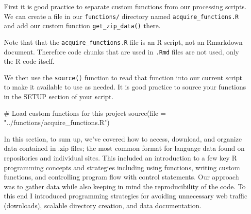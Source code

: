 \documentclass[
  letterpaper,
]{latex/krantz}
\newenvironment{Shaded}{\begin{snugshade}}{\end{snugshade}}
\newcommand{\AttributeTok}[1]{\textcolor[rgb]{0.40,0.45,0.13}{#1}}
\newcommand{\CommentTok}[1]{\textcolor[rgb]{0.37,0.37,0.37}{#1}}
\newcommand{\FunctionTok}[1]{\textcolor[rgb]{0.28,0.35,0.67}{#1}}
\newcommand{\NormalTok}[1]{\textcolor[rgb]{0.00,0.23,0.31}{#1}}
\newcommand{\StringTok}[1]{\textcolor[rgb]{0.13,0.47,0.30}{#1}}
\begin{document}
First it is good practice to separate custom functions from our
processing scripts. We can create a file in our \texttt{functions/}
directory named \texttt{acquire\_functions.R} and add our custom
function \texttt{get\_zip\_data()} there.

\begin{tcolorbox}[enhanced jigsaw, opacitybacktitle=0.6, breakable, colframe=quarto-callout-warning-color-frame, arc=.35mm, left=2mm, leftrule=.75mm, title=\textcolor{quarto-callout-warning-color}{\faExclamationTriangle}\hspace{0.5em}{Tip}, opacityback=0, colback=white, toptitle=1mm, rightrule=.15mm, titlerule=0mm, bottomtitle=1mm, bottomrule=.15mm, coltitle=black, colbacktitle=quarto-callout-warning-color!10!white, toprule=.15mm]
Note that that the \texttt{acquire\_functions.R} file is an R script,
not an Rmarkdown document. Therefore code chunks that are used in
\texttt{.Rmd} files are not used, only the R code itself.
\end{tcolorbox}

We then use the \texttt{source()} function to read that function into
our current script to make it available to use as needed. It is good
practice to source your functions in the SETUP section of your script.

\begin{Shaded}
\begin{Highlighting}[]
\CommentTok{\# Load custom functions for this project}
\FunctionTok{source}\NormalTok{(}\AttributeTok{file =} \StringTok{"../functions/acquire\_functions.R"}\NormalTok{)}
\end{Highlighting}
\end{Shaded}

In this section, to sum up, we've covered how to access, download, and
organize data contained in .zip files; the most common format for
language data found on repositories and individual sites. This included
an introduction to a few key R programming concepts and strategies
including using functions, writing custom functions, and controlling
program flow with control statements. Our approach was to gather data
while also keeping in mind the reproducibility of the code. To this end
I introduced programming strategies for avoiding unnecessary web traffic
(downloads), scalable directory creation, and data documentation.
\end{document}
